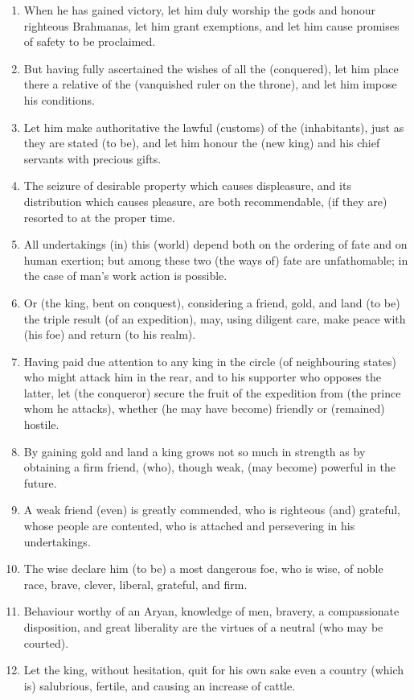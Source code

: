 \begin{enumerate}
\item When he has gained victory, let him duly worship the gods and honour righteous Brahmanas, let him grant exemptions, and let him cause promises of safety to be proclaimed.
\item But having fully ascertained the wishes of all the (conquered), let him place there a relative of the (vanquished ruler on the throne), and let him impose his conditions.
\item Let him make authoritative the lawful (customs) of the (inhabitants), just as they are stated (to be), and let him honour the (new king) and his chief servants with precious gifts.
\item The seizure of desirable property which causes displeasure, and its distribution which causes pleasure, are both recommendable, (if they are) resorted to at the proper time.
\item All undertakings (in) this (world) depend both on the ordering of fate and on human exertion; but among these two (the ways of) fate are unfathomable; in the case of man's work action is possible.
\item Or (the king, bent on conquest), considering a friend, gold, and land (to be) the triple result (of an expedition), may, using diligent care, make peace with (his foe) and return (to his realm).
\item Having paid due attention to any king in the circle (of neighbouring states) who might attack him in the rear, and to his supporter who opposes the latter, let (the conqueror) secure the fruit of the expedition from (the prince whom he attacks), whether (he may have become) friendly or (remained) hostile.
\item By gaining gold and land a king grows not so much in strength as by obtaining a firm friend, (who), though weak, (may become) powerful in the future.
\item A weak friend (even) is greatly commended, who is righteous (and) grateful, whose people are contented, who is attached and persevering in his undertakings.
\item The wise declare him (to be) a most dangerous foe, who is wise, of noble race, brave, clever, liberal, grateful, and firm.
\item Behaviour worthy of an Aryan, knowledge of men, bravery, a compassionate disposition, and great liberality are the virtues of a neutral (who may be courted).
\item Let the king, without hesitation, quit for his own sake even a country (which is) salubrious, fertile, and causing an increase of cattle.

\end{enumerate}
